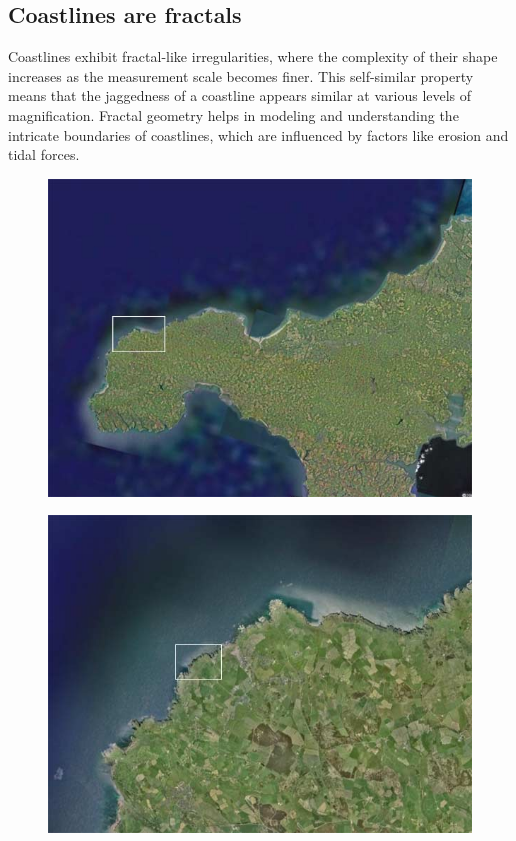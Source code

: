 \documentclass[12pt]{article}
\begin{document}
\subsection{Coastlines are fractals}
Coastlines exhibit fractal-like irregularities, where the complexity of their shape increases as the measurement scale becomes finer. This self-similar property means that the jaggedness of a coastline appears similar at various levels of magnification. Fractal geometry helps in modeling and understanding the intricate boundaries of coastlines, which are influenced by factors like erosion and tidal forces.

\begin{figure}[H]
    \centering
    \begin{minipage}[b]{0.5\textwidth}
        \centering
        \includegraphics[width=\textwidth]{assets/uk2.jpg}
        \label{fig:uk2}
    \end{minipage}
    \hspace{0.05\textwidth} %
    \begin{minipage}[b]{0.5\textwidth}
        \centering
        \includegraphics[width=\textwidth]{assets/uk3.jpg}

\end{minipage}
\end{figure}
\end{document}
